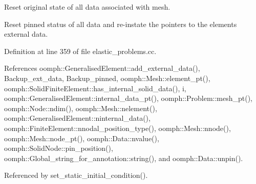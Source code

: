 Reset original state of all data associated with mesh. 

Reset pinned status of all data and re-\/instate the pointers to the elements\textquotesingle{} external data. 

Definition at line 359 of file elastic\+\_\+problems.\+cc.



References oomph\+::\+Generalised\+Element\+::add\+\_\+external\+\_\+data(), Backup\+\_\+ext\+\_\+data, Backup\+\_\+pinned, oomph\+::\+Mesh\+::element\+\_\+pt(), oomph\+::\+Solid\+Finite\+Element\+::has\+\_\+internal\+\_\+solid\+\_\+data(), i, oomph\+::\+Generalised\+Element\+::internal\+\_\+data\+\_\+pt(), oomph\+::\+Problem\+::mesh\+\_\+pt(), oomph\+::\+Node\+::ndim(), oomph\+::\+Mesh\+::nelement(), oomph\+::\+Generalised\+Element\+::ninternal\+\_\+data(), oomph\+::\+Finite\+Element\+::nnodal\+\_\+position\+\_\+type(), oomph\+::\+Mesh\+::nnode(), oomph\+::\+Mesh\+::node\+\_\+pt(), oomph\+::\+Data\+::nvalue(), oomph\+::\+Solid\+Node\+::pin\+\_\+position(), oomph\+::\+Global\+\_\+string\+\_\+for\+\_\+annotation\+::string(), and oomph\+::\+Data\+::unpin().



Referenced by set\+\_\+static\+\_\+initial\+\_\+condition().

\mbox{\label{classoomph_1_1SolidICProblem_a07e954c951e4eefa7ac7c99ba74e81cc}} 
